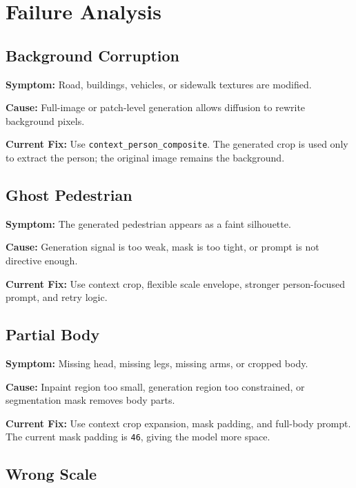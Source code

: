\documentclass[12pt,a4paper]{article}
\begin{document}
\section{Failure Analysis}

\subsection{Background Corruption}

\textbf{Symptom:} Road, buildings, vehicles, or sidewalk textures are modified.

\textbf{Cause:} Full-image or patch-level generation allows diffusion to rewrite
background pixels.

\textbf{Current Fix:} Use \texttt{context\_person\_composite}. The generated
crop is used only to extract the person; the original image remains the
background.

\subsection{Ghost Pedestrian}

\textbf{Symptom:} The generated pedestrian appears as a faint silhouette.

\textbf{Cause:} Generation signal is too weak, mask is too tight, or prompt is
not directive enough.

\textbf{Current Fix:} Use context crop, flexible scale envelope, stronger
person-focused prompt, and retry logic.

\subsection{Partial Body}

\textbf{Symptom:} Missing head, missing legs, missing arms, or cropped body.

\textbf{Cause:} Inpaint region too small, generation region too constrained, or
segmentation mask removes body parts.

\textbf{Current Fix:} Use context crop expansion, mask padding, and full-body
prompt. The current mask padding is \texttt{46}, giving the model more space.

\subsection{Wrong Scale}
\end{document}
